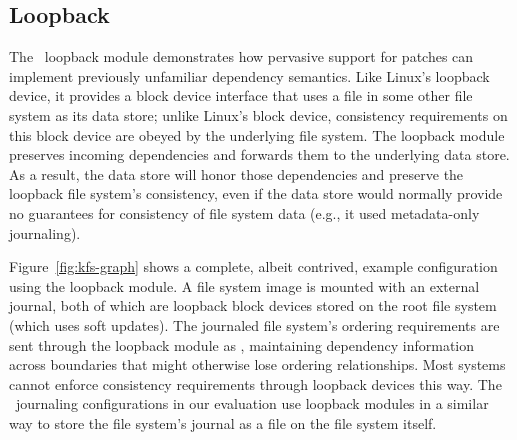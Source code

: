 



\subsection{Loopback}
\label{sec:modules:loop}

The \Featherstitch\ loopback module demonstrates how pervasive
support for patches can implement previously unfamiliar dependency
semantics.
%
Like Linux's loopback device, it provides a block device interface that
uses a file in some other file system as its data store; unlike Linux's
block device, consistency requirements on this block device are obeyed by
the underlying file system.
%
The loopback module preserves incoming dependencies and forwards
them to the underlying data store.
%
As a result, the data store will honor those dependencies and preserve the
loopback file system's consistency, even if the data store would normally
provide no guarantees for consistency of file system data (e.g., it used
metadata-only journaling).

Figure~\ref{fig:kfs-graph} shows a complete, albeit contrived, example
configuration using the loopback module.
%
A file system image is mounted with an external journal, both of
which are loopback block devices stored on the root file system (which uses
soft updates). The journaled file system's ordering requirements are sent
through the loopback module as \patches, maintaining dependency information
across boundaries that might otherwise lose ordering relationships. 
Most systems cannot enforce consistency requirements through loopback
devices this way.
%
The \Featherstitch\ journaling configurations in our evaluation use
loopback modules in a similar way to store the file system's journal as a
file on the file system itself.



\begin{comment}
\subsection{Asynchronous writes}
\label{sec:modules:unlink}

Finally, we also wrote a trivial module that removes all dependencies from
incoming \patches, allowing the buffer cache to write blocks in any order.
%
This implements similar semantics to existing file systems like ext2 in
asynchronous write mode.
\end{comment}
